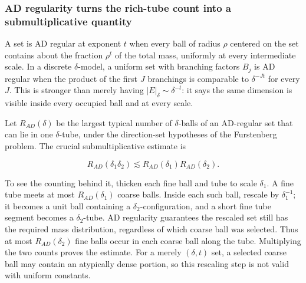 \subsubsection{AD regularity turns the rich-tube count into a submultiplicative quantity}\label{04-visual-computing-ii-ch033-ad-regularity-turns-the-rich-tube-count-into-a-submultiplicative-quantity}

\hypertarget{04-visual-computing-ii-ch033-ad-regularity-turns-the-rich-tube-count-into-a-submultiplicative-quantity}{}

A set is AD regular at exponent \(t\) when every ball of radius \(\rho\) centered on the set contains about the fraction \(\rho^t\) of the total mass, uniformly at every intermediate scale. In a discrete \(\delta\)-model, a uniform set with branching factors \(B_j\) is AD regular when the product of the first \(J\) branchings is comparable to \(\delta^{-Jt}\) for every \(J\). This is stronger than merely having \(|E|_\delta\sim\delta^{-t}\): it says the same dimension is visible inside every occupied ball and at every scale.

Let \(R_{AD}(\delta)\) be the largest typical number of \(\delta\)-balls of an AD-regular set that can lie in one \(\delta\)-tube, under the direction-set hypotheses of the Furstenberg problem. The crucial submultiplicative estimate is

\[R_{AD}(\delta_1\delta_2)\lesssim R_{AD}(\delta_1)R_{AD}(\delta_2).\]

To see the counting behind it, thicken each fine ball and tube to scale \(\delta_1\). A fine tube meets at most \(R_{AD}(\delta_1)\) coarse balls. Inside each such ball, rescale by \(\delta_1^{-1}\); it becomes a unit ball containing a \(\delta_2\)-configuration, and a short fine tube segment becomes a \(\delta_2\)-tube. AD regularity guarantees the rescaled set still has the required mass distribution, regardless of which coarse ball was selected. Thus at most \(R_{AD}(\delta_2)\) fine balls occur in each coarse ball along the tube. Multiplying the two counts proves the estimate. For a merely \((\delta,t)\) set, a selected coarse ball may contain an atypically dense portion, so this rescaling step is not valid with uniform constants.

